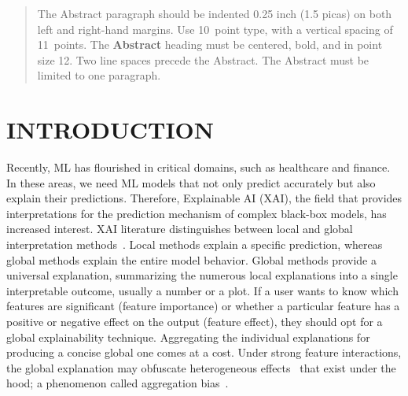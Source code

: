 \documentclass[twoside]{article}
\begin{document}
%

%


\begin{abstract}
  The Abstract paragraph should be indented 0.25 inch (1.5 picas) on
  both left and right-hand margins. Use 10~point type, with a vertical
  spacing of 11~points. The \textbf{Abstract} heading must be centered,
  bold, and in point size 12. Two line spaces precede the
  Abstract. The Abstract must be limited to one paragraph.
\end{abstract}


\section{INTRODUCTION}

Recently, ML has flourished in critical domains, such as healthcare
and finance. In these areas, we need ML models that not only predict
accurately but also explain their predictions. Therefore, Explainable
AI (XAI), the field that provides interpretations for the prediction
mechanism of complex black-box models, has increased interest. XAI
literature distinguishes between local and global interpretation
methods~\citep{Molnar2020interpretable}. Local methods explain a
specific prediction, whereas global methods explain the entire model
behavior. Global methods provide a universal explanation, summarizing
the numerous local explanations into a single interpretable outcome,
usually a number or a plot. If a user wants to know which features are
significant (feature importance) or whether a particular feature has a
positive or negative effect on the output (feature effect), they
should opt for a global explainability technique. Aggregating the
individual explanations for producing a concise global one comes at a
cost. Under strong feature interactions, the global explanation may
obfuscate heterogeneous effects~\citep{Herbinger2022repid} that exist
under the hood; a phenomenon called aggregation
bias~\citep{mehrabi2021survey}.
\end{document}
